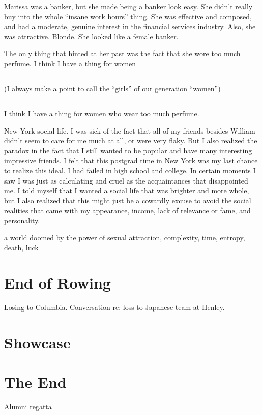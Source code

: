 Marissa was a banker, but she made being a banker look easy.  She didn't really
buy into the whole ``insane work hours'' thing.  She was effective and composed,
and had a moderate, genuine interest in the financial services industry.  Also,
she was attractive.  Blonde.  She looked like a female banker. 

The only thing that hinted at her past was the fact that she wore too much
perfume.  I think I have a thing for women \section{} (I always make a point to call
the ``girls'' of our generation ``women'') \section{} I think I have a thing for women
who wear too much perfume.

New York social life.  I was sick of the fact that all of my friends besides
William didn't seem to care for me much at all, or were very flaky.  But I also
realized the paradox in the fact that I still wanted to be popular and have many
interesting impressive friends.  I felt that this postgrad time in New York was
my last chance to realize this ideal.  I had failed in high school and college.
In certain moments I saw I was just as calculating and cruel as the
acquaintances that disappointed me.  I told myself that I wanted a social life
that was brighter and more whole, but I also realized that this might just be a
cowardly excuse to avoid the social realities that came with my appearance,
income, lack of relevance or fame, and personality.

a world doomed by the power of sexual attraction, complexity, time, entropy,
death, luck

\chapter{End of Rowing}
Losing to Columbia.
Conversation re: loss to Japanese team at Henley.

\chapter{Showcase}


\chapter{The End}
Alumni regatta


